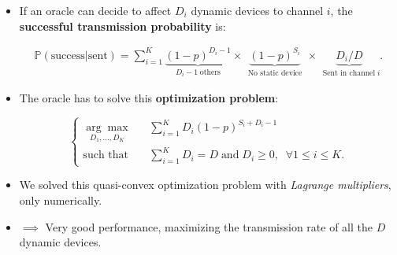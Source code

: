 \begin{frameO}

    \begin{itemize}\tightlist
        \item
              If an oracle can decide to affect \(D_i\) dynamic devices to channel
              \(i\), the \textbf{successful transmission probability} is:
              \vspace*{-10pt}

              \begin{small} \begin{align*}
                      \mathbb{P}(\text{success}|\text{sent}) = \sum_{i=1}^{K} \underbrace{(1 - p)^{D_i - 1}}_{\;\;D_i - 1 \;\text{others}\;\;} \times \underbrace{(1 - p)^{S_i}}_{\;\;\text{No static device}\;\;} \times \underbrace{ D_i / D }_{\;\;\text{Sent in channel}\; i}.
                  \end{align*} \end{small}
        \item
              The oracle has to solve this \textbf{optimization problem}:
              \vspace*{-5pt}

              \begin{small} \begin{equation*} \begin{cases}
                          \underset{D_1,\dots,D_{K}}{\arg\max}\;\;\; & \sum_{i=1}^{K} D_i (1 - p)^{S_i + D_i -1}                                             \\
                          \text{such that}\;\;\;                       & \sum_{i=1}^{K} D_i = D \; \text{and} \; D_i \geq 0, \; \; \forall 1 \leq i \leq K .
                      \end{cases} \end{equation*} \end{small}
        \item
              We solved this quasi-convex optimization problem with \emph{Lagrange
                  multipliers}, only numerically.
        \item
              \(\implies\) Very good performance, maximizing the transmission rate
              of all the \(D\) dynamic devices.
    \end{itemize}

\end{frameO}

